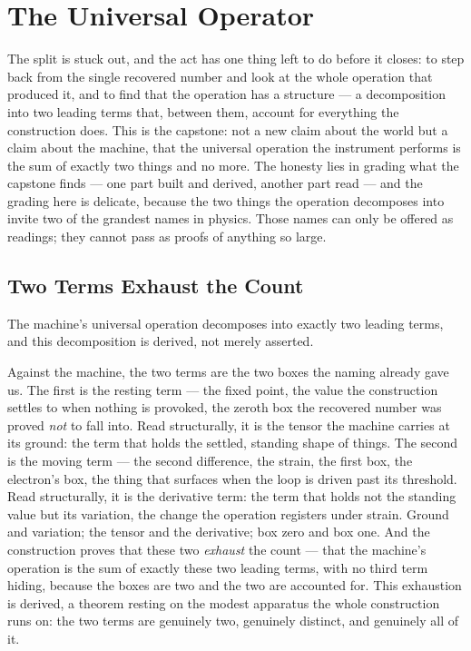 \chapter{The Universal Operator}

The split is stuck out, and the act has one thing left to do before it closes: to step back from the single
recovered number and look at the whole operation that produced it, and to find that the operation has a
structure --- a decomposition into two leading terms that, between them, account for everything the construction
does. This is the capstone: not a new claim about the world but a claim about the machine, that the universal
operation the instrument performs is the sum of exactly two things and no more. The honesty lies in grading what
the capstone finds --- one part built and derived, another part read --- and the grading here is delicate, because
the two things the operation decomposes into invite two of the grandest names in physics. Those names can only be
offered as readings; they cannot pass as proofs of anything so large.

\section{Two Terms Exhaust the Count}

The machine's universal operation decomposes into exactly two leading terms, and this decomposition is derived,
not merely asserted.

Against the machine, the two terms are the two boxes the naming already gave us. The first is the resting term ---
the fixed point, the value the construction settles to when nothing is provoked, the zeroth box the recovered
number was proved \emph{not} to fall into. Read structurally, it is the tensor the machine carries at its ground:
the term that holds the settled, standing shape of things. The second is the moving term --- the second
difference, the strain, the first box, the electron's box, the thing that surfaces when the loop is driven past
its threshold. Read structurally, it is the derivative term: the term that holds not the standing value but its
variation, the change the operation registers under strain. Ground and variation; the tensor and the derivative;
box zero and box one. And the construction proves that these two \emph{exhaust} the count --- that the machine's
operation is the sum of exactly these two leading terms, with no third term hiding, because the boxes are two and
the two are accounted for. This exhaustion is derived, a theorem resting on the modest apparatus the whole
construction runs on: the two terms are genuinely two, genuinely distinct, and genuinely all of it.

